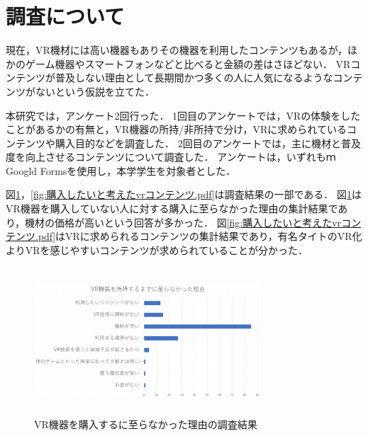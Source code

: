 \documentclass[twocolumn,10pt,a4j]{ltjsarticle}
\begin{document}



\section{調査について}
現在，VR機材には高い機器もありその機器を利用したコンテンツもあるが，ほかのゲーム機器やスマートフォンなどと比べると金額の差はさほどない．
VRコンテンツが普及しない理由として長期間かつ多くの人に人気になるようなコンテンツがないという仮説を立てた．

本研究では，アンケート2回行った．
1回目のアンケートでは，VRの体験をしたことがあるかの有無と，VR機器の所持/非所持で分け，VRに求められているコンテンツや購入目的などを調査した．
2回目のアンケートでは，主に機材と普及度を向上させるコンテンツについて調査した．
アンケートは，いずれもｍGoogld Formsを使用し，本学学生を対象者とした．

図\ref{fig:vr機器を所持するまでに至らなかった理由.pdf}，\ref{fig:購入したいと考えたvrコンテンツ.pdf}は調査結果の一部である．
図\ref{fig:vr機器を所持するまでに至らなかった理由.pdf}はVR機器を購入していない人に対する購入に至らなかった理由の集計結果であり，機材の価格が高いという回答が多かった．
図\ref{fig:購入したいと考えたvrコンテンツ.pdf}はVRに求められるコンテンツの集計結果であり，有名タイトのVR化よりVRを感じやすいコンテンツが求められていることが分かった．

\begin{figure}[h]
\begin{center}
 \includegraphics[clip,width=85mm,height=55mm]{vr機器を所持するまでに至らなかった理由.pdf}
\end{center}
 \caption{VR機器を購入するに至らなかった理由の調査結果}
 \label{fig:vr機器を所持するまでに至らなかった理由.pdf}
\end{figure}
\vspace{2mm}
\end{document}

